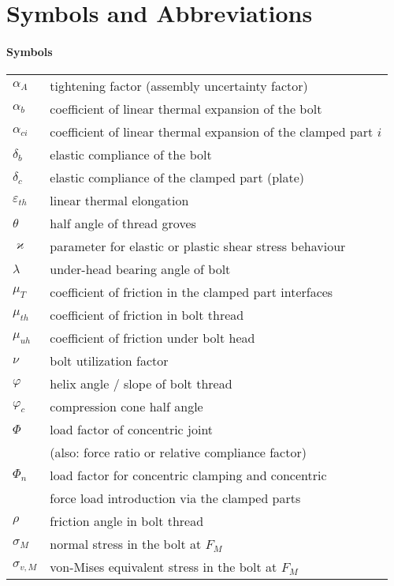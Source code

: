 \chapter*{Symbols and Abbreviations}

\subsubsection*{Symbols}
\begin{longtable}{p{2cm} l}
  $\alpha_A$ & tightening factor (assembly uncertainty factor)\\
  $\alpha_b$ & coefficient of linear thermal expansion of the bolt \\
  $\alpha_{ci}$ & coefficient of linear thermal expansion of the clamped part $i$ \\
  $\delta_b$ & elastic compliance of the bolt \\
  $\delta_c$ & elastic compliance of the clamped part (plate) \\
  $\varepsilon_{th}$ & linear thermal elongation \\
  $\theta$ & half angle of thread groves \\
  $\varkappa$ & parameter for elastic or plastic shear stress behaviour \\
  $\lambda$ & under-head bearing angle of bolt \\
  $\mu_T$ & coefficient of friction in the clamped part interfaces \\
  $\mu_{th}$ & coefficient of friction in bolt thread \\
  $\mu_{uh}$ & coefficient of friction under bolt head \\
  $\nu$ & bolt utilization factor \\
  $\varphi$ & helix angle / slope of bolt thread \\
  $\varphi_c$ & compression cone half angle \\
  $\Phi$ & load factor of concentric joint \\
         & (also: force ratio or relative compliance factor) \\
  $\Phi_n$ & load factor for concentric clamping and concentric \\
           & force load introduction via the clamped parts \\
  $\rho$ & friction angle in bolt thread \\
  $\sigma_M$ & normal stress in the bolt at $F_M$ \\
  $\sigma_{v,M}$ & von-Mises equivalent stress in the bolt at $F_M$ \\

\end{longtable}
